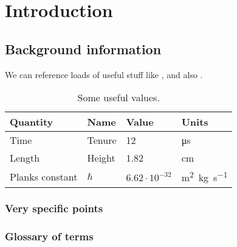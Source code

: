 \documentclass[english,twoside,12pt]{extarticle}
\begin{document}



%



\cleardoublepage %
\setcounter{section}{0}

\section{Introduction}
\subsection{Background information}
\lipsum[2]

We can reference loads of useful stuff like , and also .
\begin{table}[htb]
\centering
\begin{tabular}{llll}
Quantity & Name & Value & Units \\ \hline
Time & Tenure & 12 & \si{\micro\second} \\
Length & Height & 1.82 & \si{\centi\meter} \\
Planks constant & $ \hbar $ & $ 6.62\cdot10^{-32} $ & \si{\meter^2.\kilogram.\second^{-1}} \\
\end{tabular}
\caption{Some useful values.}
\label{tab:some_useful_values}
\end{table}

\subsubsection{Very specific points}
\lipsum[3]
\subsubsection*{Glossary of terms}
\end{document}
